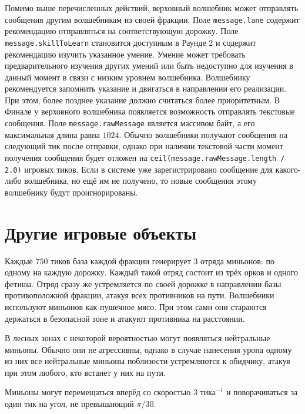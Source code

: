 
Помимо выше перечисленных действий, верховный волшебник может отправлять сообщения другим волшебникам из своей фракции. Поле
\texttt{message.lane} содержит рекомендацию отправляться на соответствующую дорожку. Поле \texttt{message.skillToLearn} становится доступным
в Раунде $2$ и содержит рекомендацию изучить указанное умение. Умение может требовать предварительного изучения других умений или быть
недоступно для изучения в данный момент в связи с низким уровнем волшебника. Волшебнику рекомендуется запомнить указание и двигаться в
направлении его реализации. При этом, более позднее указание должно считаться более приоритетным. В Финале у верховного волшебника
появляется возможность отправлять текстовые сообщения. Поле \texttt{message.rawMessage} является массивом байт, а его максимальная длина
равна $1024$. Обычно волшебники получают сообщения на следующий тик после отправки, однако при наличии текстовой части момент получения
сообщения будет отложен на \texttt{ceil(message.rawMessage.length / 2.0)} игровых тиков. Если в системе уже зарегистрировано сообщение для
какого-либо волшебника, но ещё им не получено, то новые сообщения этому волшебнику будут проигнорированы.

\section{Другие игровые объекты}

Каждые $750$ тиков база каждой фракции генерирует $3$ отряда миньонов: по одному на каждую дорожку. Каждый такой отряд состоит из трёх орков
и одного фетиша. Отряд сразу же устремляется по своей дорожке в направлении базы противоположной фракции, атакуя всех противников на пути.
Волшебники используют миньонов как пушечное мясо. При этом сами они стараются держаться в безопасной зоне и атакуют противника на
расстоянии.

В лесных зонах с некоторой вероятностью могут появляться нейтральные миньоны. Обычно они не агрессивны, однако в случае нанесения урона
одному из них все нейтральные миньоны поблизости устремляются к обидчику, атакуя при этом любого, кто встанет у них на пути.

Миньоны могут перемещаться вперёд со скоростью $3$ тика$^{-1}$ и поворачиваться за один тик на угол, не превышающий $\pi / 30$.


